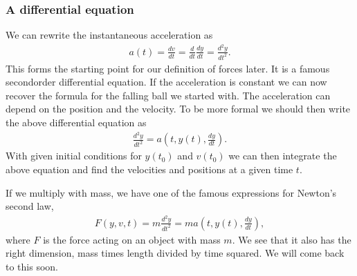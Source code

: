 \documentclass[letterpaper,10pt,english]{sphinxmanual}
\begin{document}
\subsubsection{A differential equation}
\label{\detokenize{chapter2:a-differential-equation}}
We can rewrite the instantaneous acceleration as
\begin{equation*}
\begin{split}
a(t) = \frac{dv}{dt}=\frac{d}{dt}\frac{dy}{dt}=\frac{d^2y}{dt^2}.
\end{split}
\end{equation*}
This forms the starting point for our definition of forces later. It is a famous second\sphinxhyphen{}order differential equation. If the acceleration is constant we can now recover the formula for the falling ball we started with.
The acceleration can depend on the position and the velocity. To be more formal we should then write the above differential equation as
\begin{equation*}
\begin{split}
\frac{d^2y}{dt^2}=a(t,y(t),\frac{dy}{dt}).
\end{split}
\end{equation*}
With given initial conditions for \(y(t_0)\) and \(v(t_0)\) we can then
integrate the above equation and find the velocities and positions at
a given time \(t\).

If we multiply with mass, we have one of the famous expressions for Newton’s second law,
\begin{equation*}
\begin{split}
F(y,v,t)=m\frac{d^2y}{dt^2}=ma(t,y(t),\frac{dy}{dt}),
\end{split}
\end{equation*}
where \(F\) is the force acting on an object with mass \(m\). We see that it also has the right dimension, mass times length divided by time squared.
We will come back to this soon.
\end{document}
